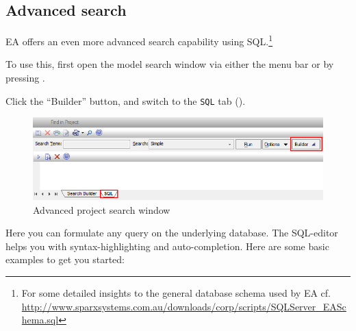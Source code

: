 \subsection{Advanced search}
\label{sect:appendix_adv_search}

EA offers an even more advanced search capability using SQL.\footnote{For some detailed insights to the general database schema used by EA cf. \\
\url{http://www.sparxsystems.com.au/downloads/corp/scripts/SQLServer_EASchema.sql}}

\begin{stepbystep}

\item To use this, first open the model search window via either the menu bar or by pressing .

\item Click the ``Builder'' button, and switch to the \texttt{SQL} tab (). 

\begin{figure}[htbp]
\begin{center}
  \includegraphics[width=\textwidth]{../../org.moflon.doc.handbook.05_miscellaneous/1_grokkingEA/08_advSearch/ea_activateSQLSearch}
  \caption{Advanced project search window}  
  \label{ea:builderSQLtab}
\end{center}
\end{figure}

\end{stepbystep}

Here you can formulate any query on the underlying database. The SQL-editor helps you with syntax-highlighting and auto-completion. Here are some basic
examples to get you started:


